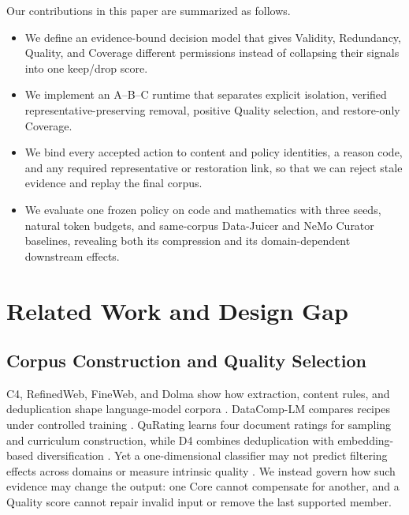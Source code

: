 \documentclass[conference]{IEEEtran}
\begin{document}
Our contributions in this paper are summarized as follows.
\begin{itemize}
\setlength{\itemsep}{1pt}
\setlength{\parskip}{0pt}
\setlength{\parsep}{0pt}
\item We define an evidence-bound decision model that gives Validity,
Redundancy, Quality, and Coverage different permissions instead of collapsing
their signals into one keep/drop score.
\item We implement an A--B--C runtime that separates explicit isolation,
verified representative-preserving removal, positive Quality selection, and
restore-only Coverage.
\item We bind every accepted action to content and policy identities, a reason
code, and any required representative or restoration link, so that we can
reject stale evidence and replay the final corpus.
\item We evaluate one frozen policy on code and mathematics with three seeds,
natural token budgets, and same-corpus Data-Juicer and NeMo Curator baselines,
revealing both its compression and its domain-dependent downstream effects.
\end{itemize}

\section{Related Work and Design Gap}
\subsection{Corpus Construction and Quality Selection}
C4, RefinedWeb, FineWeb, and Dolma show how extraction, content rules, and
deduplication shape language-model corpora
\cite{raffel2020c4,penedo2023refinedweb,penedo2024fineweb,soldaini2024dolma}.
DataComp-LM compares recipes under controlled training \cite{li2024datacomp}.
QuRating learns four document ratings for sampling and curriculum construction,
while D4 combines deduplication with embedding-based diversification
\cite{wettig2024qurating,tirumala2023d4}. Yet a one-dimensional classifier may
not predict filtering effects across domains or measure intrinsic quality
\cite{longpre2024pretrainer,naitsaada2025illusion}. We instead govern how such
evidence may change the output: one Core cannot compensate for another, and a
Quality score cannot repair invalid input or remove the last supported member.
\end{document}
